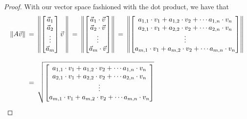 \begin{proof}
    With our vector space fashioned with the dot product, we have that
    \begin{align*}
        \left\lVert A\vec{v}\right\rVert \hspace{2pt} &= \hspace{2pt} \left\lVert
        \begin{bmatrix}
            \vec{a}_{1}\\
            \vec{a}_{2}\\
            \vdots\\
            \vec{a}_{m}
        \end{bmatrix}
        \vec{v} \hspace{2pt}
        \right\rVert \hspace{2pt} = \hspace{2pt} \left\lVert
        \begin{bmatrix}
            \vec{a}_{1} \cdot \vec{v}\\
            \vec{a}_{2} \cdot \vec{v}\\
            \vdots\\
            \vec{a}_{m} \cdot \vec{v}
        \end{bmatrix}
        \right\rVert \hspace{2pt} = \hspace{2pt} \left\lVert
        \begin{bmatrix}
            a_{1,1} \cdot v_{1} + a_{1,2} \cdot v_{2} + \cdots a_{1,n} \cdot v_{n}\\
            a_{2,1} \cdot v_{1} + a_{2,2} \cdot v_{2} + \cdots a_{2,n} \cdot v_{n}\\
            \vdots\\
            a_{m,1} \cdot v_{1} + a_{m,2} \cdot v_{2} + \cdots a_{m,n} \cdot v_{n}\\
        \end{bmatrix}
        \right\rVert\\[2ex]
        &= \hspace{2pt} \sqrt{ 
        \begin{bmatrix}
            a_{1,1} \cdot v_{1} + a_{1,2} \cdot v_{2} + \cdots a_{1,n} \cdot v_{n}\\
            a_{2,1} \cdot v_{1} + a_{2,2} \cdot v_{2} + \cdots a_{2,n} \cdot v_{n}\\
            \vdots\\
            a_{m,1} \cdot v_{1} + a_{m,2} \cdot v_{2} + \cdots a_{m,n} \cdot v_{n}\\
        \end{bmatrix}
}
\end{align*}
\end{proof}
